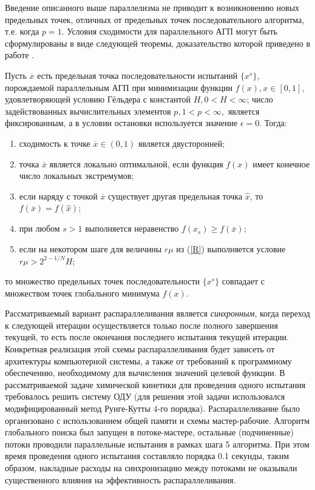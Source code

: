 \documentclass{cmi1}
\begin{document}
Введение описанного выше параллелизма не приводит к возникновению новых предельных точек, отличных от предельных точек последовательного алгоритма, т.е. когда $p = 1$. Условия сходимости для параллельного АГП могут быть сформулированы в виде следующей теоремы, доказательство которой приведено в работе .

\begin{theorem*}%
	Пусть $\overline{x}$ есть предельная точка последовательности испытаний $\{x^s\}$, порождаемой параллельным АГП при минимизации функции $f(x), x\in [0,1],$ удовлетворяющей условию Гёльдера с константой $H, 0<H<\infty$; число задействованных вычислительных элементов $p, 1<p<\infty,$ является фиксированным, а в условии остановки используется значение $\epsilon = 0$. Тогда:
	\begin{enumerate}
		\item
		сходимость к точке $\overline{x} \in (0,1) $ является двусторонней;
		\item
		точка $\overline{x}$ является локально оптимальной, если функция $f(x)$ имеет конечное число локальных экстремумов;
		\item
		если наряду с точкой $\overline{x}$ существует другая предельная точка $\widehat{x}$, то $f(\overline{x})=f(\widehat{x})$;
		\item
		при любом $s>1$ выполняется неравенство $f(x_s) \geqslant f(\overline{x})$;
		\item
		если на некотором шаге для величины $r\mu$ из (\ref{R}) выполняется условие $r\mu > 2^{2-1/N}H$;
	\end{enumerate}
	то множество предельных точек последовательности $\{x^s\}$ совпадает с множеством точек глобального минимума $f(x)$.
\end{theorem*}

Рассматриваемый вариант распараллеливания является \textit{синхронным}, когда переход к следующей итерации осуществляется только после полного завершения текущей, то есть после окончания последнего испытания текущей итерации. 
Конкретная реализация этой схемы распараллеливания будет зависеть от архитектуры компьютерной системы, а также от требований к программному обеспечению, необходимому для вычисления значений целевой функции. 
В рассматриваемой задаче химической кинетики для проведения одного испытания требовалось решить систему ОДУ (для решения этой задачи использовался модифицированный метод Рунге-Кутты 4-го порядка). Распараллеливание было организовано с использованием общей памяти и схемы мастер-рабочие. Алгоритм глобального поиска был запущен в потоке-мастере, остальные (подчиненные) потоки проводили параллельные испытания в рамках шага 5 алгоритма. При этом время проведения одного испытания составляло порядка 0.1 секунды, таким образом, накладные расходы на синхронизацию между потоками не оказывали существенного влияния на эффективность распараллеливания.
\end{document}
